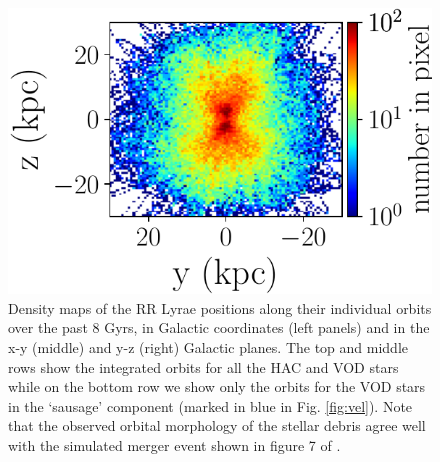 \documentclass[fleqn,usenatbib]{mnras}
\begin{document}
\begin{figure}
             \includegraphics[scale=0.302]{VOD_orbits_8Gyrs_yz_sausage.pdf}
\vspace{-0.45cm}
   \caption{Density maps of the RR Lyrae positions along their
     individual orbits over the past 8 Gyrs, in Galactic coordinates
     (left panels) and in the x-y (middle) and y-z (right) Galactic
     planes.  The top and middle rows show the integrated orbits for
     all the HAC and VOD stars while on the bottom row we show only
     the orbits for the VOD stars in the `sausage' component (marked
     in blue in Fig. \ref{fig:vel}). Note that the observed orbital
     morphology of the stellar debris agree well with the simulated
     merger event shown in figure 7 of \citet{Simion2018}.}
    \label{fig:backorbits}
\end{figure}
%
%
\end{document}
